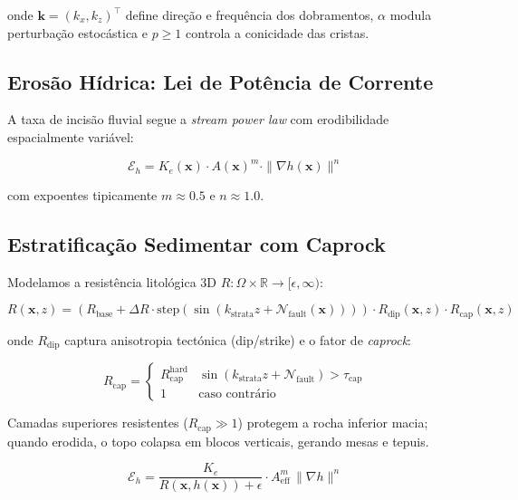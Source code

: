 \documentclass[11pt,a4paper]{article}
\begin{document}
onde $\mathbf{k} = (k_x, k_z)^\top$ define direção e frequência dos dobramentos,
$\alpha$ modula perturbação estocástica e $p \geq 1$ controla a conicidade das cristas.

\subsection{Erosão Hídrica: Lei de Potência de Corrente}

A taxa de incisão fluvial segue a \emph{stream power law} com erodibilidade espacialmente variável:

\begin{equation}
  \mathcal{E}_h = K_e(\mathbf{x}) \cdot A(\mathbf{x})^m \cdot \|\nabla h(\mathbf{x})\|^n
  \label{eq:stream-power}
\end{equation}

com expoentes tipicamente $m \approx 0.5$ e $n \approx 1.0$.

\subsection{Estratificação Sedimentar com Caprock}

Modelamos a resistência litológica 3D $R : \Omega \times \mathbb{R} \to [\epsilon, \infty)$:

\begin{equation}
  R(\mathbf{x}, z) = \left(R_{\text{base}} + \Delta R \cdot \text{step}(\sin(k_{\text{strata}} z + \mathcal{N}_{\text{fault}}(\mathbf{x})))\right)
  \cdot R_{\text{dip}}(\mathbf{x}, z)
  \cdot R_{\text{cap}}(\mathbf{x}, z)
  \label{eq:strata}
\end{equation}

onde $R_{\text{dip}}$ captura anisotropia tectónica (dip/strike) e o fator de \emph{caprock}:

\begin{equation}
  R_{\text{cap}} = \begin{cases}
    R_{\text{cap}}^{\text{hard}} & \sin(k_{\text{strata}} z + \mathcal{N}_{\text{fault}}) > \tau_{\text{cap}} \\
    1 & \text{caso contrário}
  \end{cases}
  \label{eq:caprock}
\end{equation}

Camadas superiores resistentes ($R_{\text{cap}} \gg 1$) protegem a rocha inferior macia;
quando erodida, o topo colapsa em blocos verticais, gerando mesas e tepuis.

\begin{equation}
  \mathcal{E}_h = \frac{K_e}{R(\mathbf{x}, h(\mathbf{x})) + \epsilon}
  \cdot A_{\text{eff}}^m \,\|\nabla h\|^n
  \label{eq:ke-hetero}
\end{equation}
\end{document}
